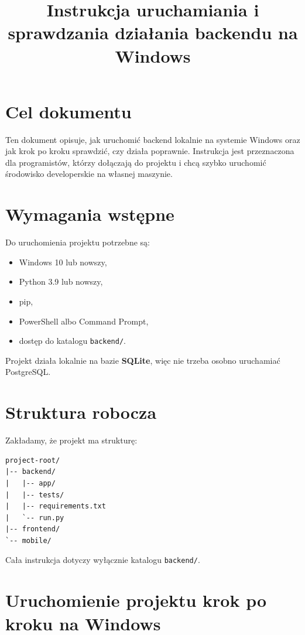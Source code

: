 \documentclass[11pt,a4paper]{article}
\title{Instrukcja uruchamiania i sprawdzania działania backendu na Windows}
\author{}
\date{}
\begin{document}
\maketitle

\section{Cel dokumentu}

Ten dokument opisuje, jak uruchomić backend lokalnie na systemie Windows oraz jak krok po kroku sprawdzić, czy działa poprawnie. Instrukcja jest przeznaczona dla programistów, którzy dołączają do projektu i chcą szybko uruchomić środowisko developerskie na własnej maszynie.

\section{Wymagania wstępne}

Do uruchomienia projektu potrzebne są:

\begin{itemize}[leftmargin=1.2cm]
    \item Windows 10 lub nowszy,
    \item Python 3.9 lub nowszy,
    \item pip,
    \item PowerShell albo Command Prompt,
    \item dostęp do katalogu \texttt{backend/}.
\end{itemize}

Projekt działa lokalnie na bazie \textbf{SQLite}, więc nie trzeba osobno uruchamiać PostgreSQL.

\section{Struktura robocza}

Zakładamy, że projekt ma strukturę:

\begin{lstlisting}
project-root/
|-- backend/
|   |-- app/
|   |-- tests/
|   |-- requirements.txt
|   `-- run.py
|-- frontend/
`-- mobile/
\end{lstlisting}

Cała instrukcja dotyczy wyłącznie katalogu \texttt{backend/}.

\section{Uruchomienie projektu krok po kroku na Windows}
\end{document}
